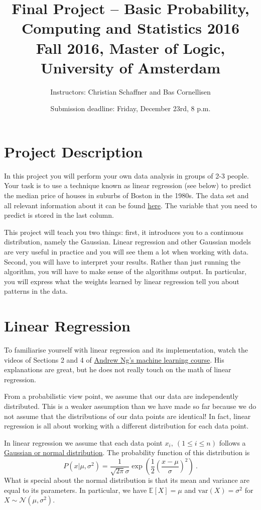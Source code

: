 \documentclass[11pt, leqno, a4paper]{article}
\title{Final Project -- Basic Probability, Computing and Statistics 2016 \\[2mm]
\large{Fall 2016, Master of Logic, University of Amsterdam}}
\author{Instructors: Christian Schaffner and Bas Cornellisen}
\date{Submission deadline: Friday, December 23rd, 8 p.m.}
\begin{document}
\maketitle

\section{Project Description}

In this project you will perform your own data analysis in groups of 2-3 people. Your task is
to use a technique known as linear regression (see below) to predict the median price of houses
in suburbs of Boston in the 1980s. The data set and all relevant information about it can be found
\href{https://archive.ics.uci.edu/ml/datasets/Housing}{here}. The variable that you need
to predict is stored in the last column.

This project will teach you two things: first, it introduces you to a continuous distribution, namely
the Gaussian. Linear regression and other Gaussian models are very useful in practice and you will
see them a lot when working with data. Second, you will have to interpret your results. Rather than
just running the algorithm, you will have to make sense of the algorithms output. In particular, you
will express what the weights learned by linear regression tell you about patterns in the data.

\section{Linear Regression}
To familiarise yourself with linear regression and its implementation, watch the
videos of Sections 2 and 4 of \href{https://www.youtube.com/watch?v=ylWBbxQHwFM&list=PLLH73N9cB21V_O2JqILVX557BST2cqJw4}{Andrew Ng's machine
learning course}. His explanations are great, but he does not really touch on the math of linear regression.

From a probabilistic view point, we assume that our data are independently distributed. This is a weaker
assumption than we have made so far because we do not assume that the distributions of our data points
are identical! In fact, linear regression is all about working with a different distribution for each
data point. 

In linear regression we assume that each data point $ x_{i},\ (1 \leq i \leq n) $ follows a 
\href{https://en.wikipedia.org/wiki/Normal_distribution}{Gaussian or normal distribution}. The probability
function of this distribution is
\begin{equation}
P(x|\mu, \sigma^{2}) = \frac{1}{\sqrt{2\pi}\sigma}\exp\left(\frac{1}{2}\left(\frac{x - \mu}{\sigma}\right)^{2}\right) \ .
\end{equation}
What is special about the normal distribution is that its mean and variance are equal to its parameters.
In particular, we have $ \mathbb{E}[X] = \mu $ and $ \text{var}(X) = \sigma^{2} $ for 
$ X \sim \mathcal{N}(\mu, \sigma^{2}) $.
\end{document}
